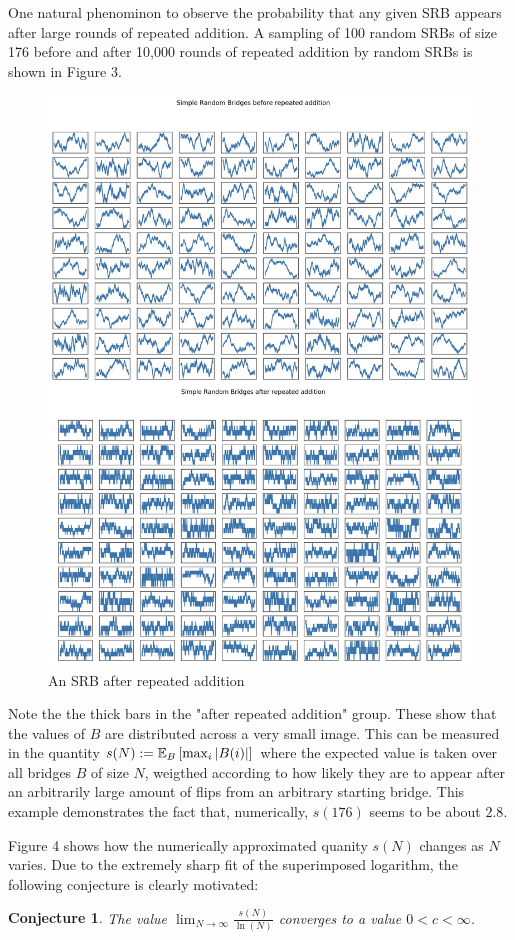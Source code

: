 \documentclass{article}
\newtheorem{conjecture}{Conjecture}
\theoremstyle{definition}
\begin{document}
One natural phenominon to observe the probability that any given SRB appears after large rounds of repeated addition. A sampling of 100 random SRBs of size 176 before and after 10,000 rounds of repeated addition by random SRBs is shown in Figure 3.

\begin{figure}[h!]
\caption{An SRB after repeated addition}
\centering
\includegraphics[width=.75\textwidth]{Figure_3}
\end{figure}

Note the the thick bars in the "after repeated addition" group. These show that the values of $B$ are distributed across a very small image. This can be measured in the quantity $s(N):=\mathbb{E}_{B}\left[\max_{i}|B(i)|\right]$ where the expected value is taken over all bridges $B$ of size $N$, weigthed according to how likely they are to appear after an arbitrarily large amount of flips from an arbitrary starting bridge. This example demonstrates the fact that, numerically, $s(176)$ seems to be about $2.8$.

Figure 4 shows how the numerically approximated quanity $s(N)$ changes as $N$ varies. Due to the extremely sharp fit of the superimposed logarithm, the following conjecture is clearly motivated:

\begin{conjecture} The value $\lim_{N\to\infty}\frac{s(N)}{\ln(N)}$ converges to a value $0<c<\infty$.
\end{conjecture}
\end{document}
